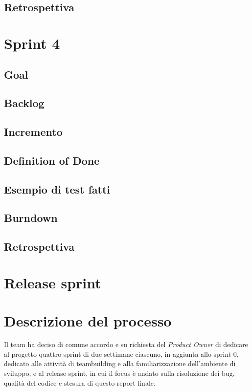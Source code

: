 \documentclass{article}
\begin{document}
\subsection{Retrospettiva}

\section{Sprint 4}

\subsection{Goal}

\subsection{Backlog}

\subsection{Incremento}

\subsection{Definition of Done}

\subsection{Esempio di test fatti}

\subsection{Burndown}

\subsection{Retrospettiva}

\section{Release sprint}

\section{Descrizione del processo}

Il team ha deciso di comune accordo e su richiesta del \textit{Product Owner} di dedicare al progetto quattro sprint di due settimane ciascuno, in aggiunta allo sprint 0, dedicato alle attività di teambuilding
e alla familiarizzazione dell'ambiente di sviluppo, e al release sprint, in cui il focus è andato sulla risoluzione dei bug, qualità del codice e stesura di questo report finale.
\end{document}
